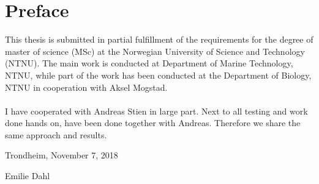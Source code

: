 \hypersetup{pageanchor=true}
%
\chapter*{Preface}
This thesis is submitted in partial fulfillment of the requirements for the degree of master of science (MSc) at the Norwegian University of Science and Technology (NTNU). The main work is conducted at Department of Marine Technology, NTNU, while part of the work has been conducted at the Department of Biology, NTNU in cooperation with Aksel Mogstad. 
\\\\
I have cooperated with Andreas Stien in large part. Next to all testing and work done hands on, have been done together with Andreas. Therefore we share the same approach and results. 

\newline
\newline


\newline
\newline
\newline
\newline
\newline
\newline
\begin{center}
    Trondheim, November 7, 2018
    \end{center}
\begin{figure}[H]
\centering
\end{figure}
\begin{center}
Emilie Dahl
\end{center}